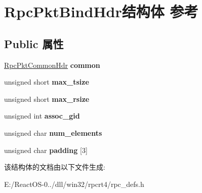 \hypertarget{struct_rpc_pkt_bind_hdr}{}\section{Rpc\+Pkt\+Bind\+Hdr结构体 参考}
\label{struct_rpc_pkt_bind_hdr}
\subsection*{Public 属性}
\begin{DoxyCompactItemize}
\item 
\mbox{\label{struct_rpc_pkt_bind_hdr_a5a3b6765b38c77f79c73f837f8d9d7d3}} 
\hyperlink{struct_rpc_pkt_common_hdr}{Rpc\+Pkt\+Common\+Hdr} {\bfseries common}
\item 
\mbox{\label{struct_rpc_pkt_bind_hdr_abf139b2c5583a4a20b92fd836a34ab6a}} 
unsigned short {\bfseries max\+\_\+tsize}
\item 
\mbox{\label{struct_rpc_pkt_bind_hdr_a9a94aa50ea5201b86f3b5da9b9c762ac}} 
unsigned short {\bfseries max\+\_\+rsize}
\item 
\mbox{\label{struct_rpc_pkt_bind_hdr_a88ab775347366c1c967765de53051e58}} 
unsigned int {\bfseries assoc\+\_\+gid}
\item 
\mbox{\label{struct_rpc_pkt_bind_hdr_ae5373588bbca32c306bb611434778d3b}} 
unsigned char {\bfseries num\+\_\+elements}
\item 
\mbox{\label{struct_rpc_pkt_bind_hdr_a021287becd104faa6027a675a65af637}} 
unsigned char {\bfseries padding} \mbox{[}3\mbox{]}
\end{DoxyCompactItemize}


该结构体的文档由以下文件生成\+:\begin{DoxyCompactItemize}
\item 
E\+:/\+React\+O\+S-\/0../dll/win32/rpcrt4/rpc\+\_\+defs.\+h\end{DoxyCompactItemize}
